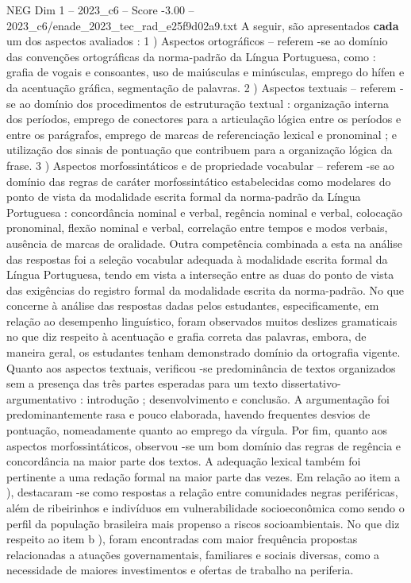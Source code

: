 \begin{textsample}{NEG Dim 1 – 2023\_c6 – Score -3.00 – 2023\_c6/enade\_2023\_tec\_rad\_e25f9d02a9.txt}
A seguir, são apresentados \textbf{cada} um dos aspectos avaliados : 1 ) Aspectos ortográficos – referem -se ao domínio das convenções ortográficas da norma-padrão da Língua Portuguesa, como : grafia de vogais e consoantes, uso de maiúsculas e minúsculas, emprego do hífen e da acentuação gráfica, segmentação de palavras. 2 ) Aspectos textuais – referem -se ao domínio dos procedimentos de estruturação textual : organização interna dos períodos, emprego de conectores para a articulação lógica entre os períodos e entre os parágrafos, emprego de marcas de referenciação lexical e pronominal ; e utilização dos sinais de pontuação que contribuem para a organização lógica da frase. 3 ) Aspectos morfossintáticos e de propriedade vocabular – referem -se ao domínio das regras de caráter morfossintático estabelecidas como modelares do ponto de vista da modalidade escrita formal da norma-padrão da Língua Portuguesa : concordância nominal e verbal, regência nominal e verbal, colocação pronominal, flexão nominal e verbal, correlação entre tempos e modos verbais, ausência de marcas de oralidade.
Outra competência combinada a esta na análise das respostas foi a seleção vocabular adequada à modalidade escrita formal da Língua Portuguesa, tendo em vista a interseção entre as duas do ponto de vista das exigências do registro formal da modalidade escrita da norma-padrão.
No que concerne à análise das respostas dadas pelos estudantes, especificamente, em relação ao desempenho linguístico, foram observados muitos deslizes gramaticais no que diz respeito à acentuação e grafia correta das palavras, embora, de maneira geral, os estudantes tenham demonstrado domínio da ortografia vigente.
Quanto aos aspectos textuais, verificou -se predominância de textos organizados sem a presença das três partes esperadas para um texto dissertativo-argumentativo : introdução ; desenvolvimento e conclusão.
A argumentação foi predominantemente rasa e pouco elaborada, havendo frequentes desvios de pontuação, nomeadamente quanto ao emprego da vírgula.
Por fim, quanto aos aspectos morfossintáticos, observou -se um bom domínio das regras de regência e concordância na maior parte dos textos.
A adequação lexical também foi pertinente a uma redação formal na maior parte das vezes.
Em relação ao item a ), destacaram -se como respostas a relação entre comunidades negras periféricas, além de ribeirinhos e indivíduos em vulnerabilidade socioeconômica como sendo o perfil da população brasileira mais propenso a riscos socioambientais.
No que diz respeito ao item b ), foram encontradas com maior frequência propostas relacionadas a atuações governamentais, familiares e sociais diversas, como a necessidade de maiores investimentos e ofertas de trabalho na periferia.

\end{textsample}
